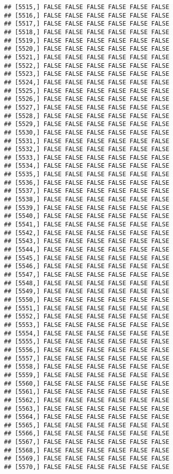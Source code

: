 \documentclass[
]{article}
\begin{document}
\begin{verbatim}
## [5515,] FALSE FALSE FALSE FALSE FALSE FALSE
## [5516,] FALSE FALSE FALSE FALSE FALSE FALSE
## [5517,] FALSE FALSE FALSE FALSE FALSE FALSE
## [5518,] FALSE FALSE FALSE FALSE FALSE FALSE
## [5519,] FALSE FALSE FALSE FALSE FALSE FALSE
## [5520,] FALSE FALSE FALSE FALSE FALSE FALSE
## [5521,] FALSE FALSE FALSE FALSE FALSE FALSE
## [5522,] FALSE FALSE FALSE FALSE FALSE FALSE
## [5523,] FALSE FALSE FALSE FALSE FALSE FALSE
## [5524,] FALSE FALSE FALSE FALSE FALSE FALSE
## [5525,] FALSE FALSE FALSE FALSE FALSE FALSE
## [5526,] FALSE FALSE FALSE FALSE FALSE FALSE
## [5527,] FALSE FALSE FALSE FALSE FALSE FALSE
## [5528,] FALSE FALSE FALSE FALSE FALSE FALSE
## [5529,] FALSE FALSE FALSE FALSE FALSE FALSE
## [5530,] FALSE FALSE FALSE FALSE FALSE FALSE
## [5531,] FALSE FALSE FALSE FALSE FALSE FALSE
## [5532,] FALSE FALSE FALSE FALSE FALSE FALSE
## [5533,] FALSE FALSE FALSE FALSE FALSE FALSE
## [5534,] FALSE FALSE FALSE FALSE FALSE FALSE
## [5535,] FALSE FALSE FALSE FALSE FALSE FALSE
## [5536,] FALSE FALSE FALSE FALSE FALSE FALSE
## [5537,] FALSE FALSE FALSE FALSE FALSE FALSE
## [5538,] FALSE FALSE FALSE FALSE FALSE FALSE
## [5539,] FALSE FALSE FALSE FALSE FALSE FALSE
## [5540,] FALSE FALSE FALSE FALSE FALSE FALSE
## [5541,] FALSE FALSE FALSE FALSE FALSE FALSE
## [5542,] FALSE FALSE FALSE FALSE FALSE FALSE
## [5543,] FALSE FALSE FALSE FALSE FALSE FALSE
## [5544,] FALSE FALSE FALSE FALSE FALSE FALSE
## [5545,] FALSE FALSE FALSE FALSE FALSE FALSE
## [5546,] FALSE FALSE FALSE FALSE FALSE FALSE
## [5547,] FALSE FALSE FALSE FALSE FALSE FALSE
## [5548,] FALSE FALSE FALSE FALSE FALSE FALSE
## [5549,] FALSE FALSE FALSE FALSE FALSE FALSE
## [5550,] FALSE FALSE FALSE FALSE FALSE FALSE
## [5551,] FALSE FALSE FALSE FALSE FALSE FALSE
## [5552,] FALSE FALSE FALSE FALSE FALSE FALSE
## [5553,] FALSE FALSE FALSE FALSE FALSE FALSE
## [5554,] FALSE FALSE FALSE FALSE FALSE FALSE
## [5555,] FALSE FALSE FALSE FALSE FALSE FALSE
## [5556,] FALSE FALSE FALSE FALSE FALSE FALSE
## [5557,] FALSE FALSE FALSE FALSE FALSE FALSE
## [5558,] FALSE FALSE FALSE FALSE FALSE FALSE
## [5559,] FALSE FALSE FALSE FALSE FALSE FALSE
## [5560,] FALSE FALSE FALSE FALSE FALSE FALSE
## [5561,] FALSE FALSE FALSE FALSE FALSE FALSE
## [5562,] FALSE FALSE FALSE FALSE FALSE FALSE
## [5563,] FALSE FALSE FALSE FALSE FALSE FALSE
## [5564,] FALSE FALSE FALSE FALSE FALSE FALSE
## [5565,] FALSE FALSE FALSE FALSE FALSE FALSE
## [5566,] FALSE FALSE FALSE FALSE FALSE FALSE
## [5567,] FALSE FALSE FALSE FALSE FALSE FALSE
## [5568,] FALSE FALSE FALSE FALSE FALSE FALSE
## [5569,] FALSE FALSE FALSE FALSE FALSE FALSE
## [5570,] FALSE FALSE FALSE FALSE FALSE FALSE

\end{verbatim}
\end{document}
